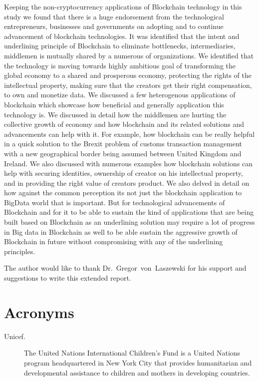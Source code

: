 Keeping the non-cryptocurrency applications of Blockchain technology
in this study we found that there is a huge endorsement from the
technological entrepreneurs, businesses and governments on adopting
and to continue advancement of blockchain technologies. It was
identified that the intent and underlining principle of Blockchain to
eliminate bottlenecks, intermediaries, middlemen is mutually shared by
a numerous of organizations. We identified that the technology is
moving towards highly ambitious goal of transforming the global
economy to a shared and prosperous economy, protecting the rights of
the intellectual property, making sure that the creators get their
right compensation, to own and monetize data. We discussed a few
heterogenous applications of blockchain which showcase how beneficial
and generally application this technology is. We discussed in detail
how the middlemen are hurting the collective growth of economy and how
blockchain and its related solutions and advancements can help with
it. For example, how blockchain can be really helpful in a quick
solution to the Brexit problem of customs transaction management with
a new geographical border being assumed between United Kingdom and
Ireland. We also discussed with numerous examples how blockchain
solutions can help with securing identities, ownership of creator on
his intellectual property, and in providing the right value of
creators product. We also delved in detail on how against the common
perception its not just the blockchain application to BigData world
that is important. But for technological advancements of Blockchain
and for it to be able to sustain the kind of applications that are
being built based on Blockchain as an underlining solution may require
a lot of progress in Big data in Blockchain as well to be able sustain
the aggressive growth of Blockchain in future without compromising
with any of the underlining principles.


\begin{acks}

The author would like to thank Dr.~Gregor~von~Laszewski for his
support and suggestions to write this extended report.

\end{acks}




\appendix

\section{Acronyms}

\begin{description}

\item[Unicef.] The United Nations International Children's Fund is a
  United Nations program headquartered in New York City that provides
  humanitarian and developmental assistance to children and mothers in
  developing countries.

\end{description}
